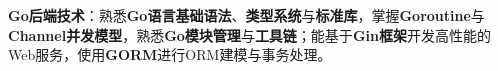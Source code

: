 \item \textbf{Go后端技术}：熟悉\textbf{Go语言基础语法}、\textbf{类型系统}与\textbf{标准库}，掌握\textbf{Goroutine}与\textbf{Channel并发模型}，熟悉\textbf{Go模块管理}与\textbf{工具链}；能基于\textbf{Gin框架}开发高性能的Web服务，使用\textbf{GORM}进行ORM建模与事务处理。